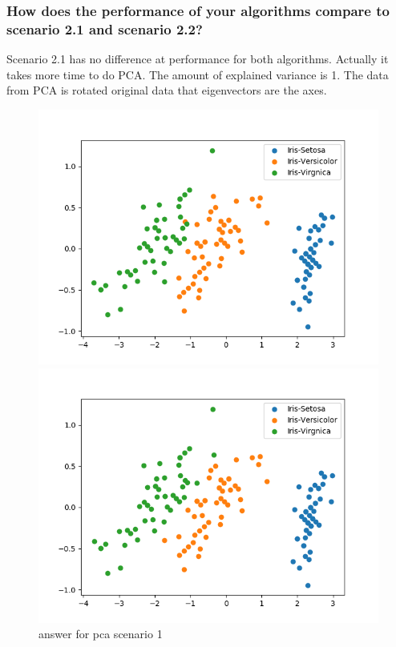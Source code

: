 \documentclass[a4paper]{article}
\begin{document}
        \subsubsection{How does the performance of your algorithms compare to scenario 2.1 and scenario 2.2?}

          Scenario 2.1 has no difference at performance for both algorithms. Actually it takes more time to do PCA.
          The amount of explained variance is 1. The data from PCA is rotated original data that eigenvectors are the axes.

          \begin{figure}[h!]
            \centering
            \begin{minipage}[t]{6.5cm}
              \includegraphics[width=1.0\textwidth]{pca_em_1_ans.png}
              \caption{answer for pca scenario 1}
            \end{minipage}
            \hspace{2cm}
            \begin{minipage}[t]{6.5cm}
              \includegraphics[width=1.0\textwidth]{pca_em_1_1.png}

\end{minipage}
\end{figure}
\end{document}

